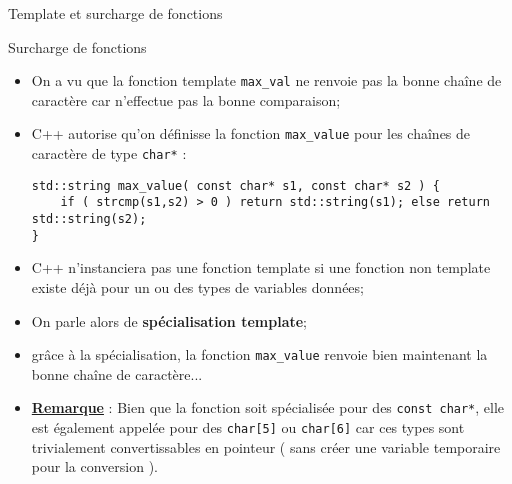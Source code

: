 \documentclass[handout,10pt]{beamer}
\begin{document}
\begin{frame}[fragile]{Template et surcharge de fonctions}
\small
\begin{block}{Surcharge de fonctions}
\begin{itemize}
\item On a vu que la fonction template \lstinline$max_val$ ne renvoie pas la bonne chaîne de caractère car n'effectue pas la bonne comparaison;
\item C++ autorise qu'on définisse la fonction \lstinline$max_value$ pour les chaînes de caractère de type \lstinline$char*$ :
\begin{lstlisting}
std::string max_value( const char* s1, const char* s2 ) {
    if ( strcmp(s1,s2) > 0 ) return std::string(s1); else return std::string(s2);
}
\end{lstlisting}
\item C++ n'instanciera pas une fonction template si une fonction non template existe déjà pour un ou des types de variables données;
\item On parle alors de {\bf\color{red}spécialisation template};
\item grâce à la spécialisation, la fonction \lstinline$max_value$ renvoie bien maintenant la bonne chaîne de caractère...
\item \textbf{\underline{Remarque}} : Bien que la fonction soit spécialisée pour des \lstinline$const char*$, elle est également appelée pour des \lstinline$char[5]$ ou \lstinline$char[6]$ car ces types sont trivialement convertissables en pointeur ( sans créer une variable temporaire pour la conversion ).
\end{itemize}
\end{block}
\end{frame}
\end{document}
